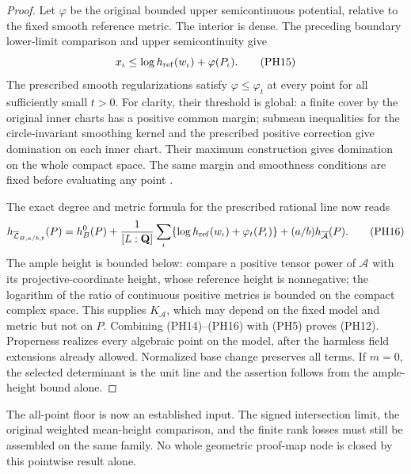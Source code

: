 \begin{proof}
Let $\varphi$ be the original bounded upper semicontinuous
potential, relative to the fixed smooth reference metric. The
interior is dense. The preceding boundary lower-limit comparison
and upper semicontinuity give
\[
                 x_\iota\le\log h_{\rm ref}(w_\iota)
                                      +\varphi(P_\iota).
 \tag{PH15}
\]
The prescribed smooth regularizations satisfy
$\varphi\le\varphi_t$ at every point for all sufficiently small
$t>0$. For clarity, their threshold is global: a finite cover by
the original inner charts has a positive common margin;
submean inequalities for the circle-invariant smoothing kernel
and the prescribed positive correction give domination on each
inner chart. Their maximum construction gives domination on the
whole compact space. The same margin and smoothness conditions
are fixed before evaluating any point
\cite{actual-point-height-source}.

The exact degree and metric formula for the prescribed rational
line now reads
\[
 h_{\overline{\mathcal L}_{B,a/b,t}}(P)
   =h_B^0(P)+\frac1{[L:\mathbf Q]}\sum_\iota
        \{\log h_{\rm ref}(w_\iota)+\varphi_t(P_\iota)\}
                                      +(a/b)h_{\overline{\mathcal A}}(P).
 \tag{PH16}
\]
The ample height is bounded below: compare a positive tensor
power of $\mathcal A$ with its projective-coordinate height,
whose reference height is nonnegative; the logarithm of the
ratio of continuous positive metrics is bounded on the compact
complex space. This supplies $K_{\mathcal A}$, which may
depend on the fixed model and metric but not on $P$.
Combining \textup{(PH14)--(PH16)} with \textup{(PH5)} proves
\textup{(PH12)}. Properness realizes every algebraic point on the
model, after the harmless field extensions already allowed.
Normalized base change preserves all terms. If $m=0$, the
selected determinant is the unit line and the assertion follows
from the ample-height bound alone.
\end{proof}

The all-point floor is now an established input. The signed
intersection limit, the original weighted mean-height comparison,
and the finite rank losses must still be assembled on the same
family. No whole geometric proof-map node is closed by this
pointwise result alone.

